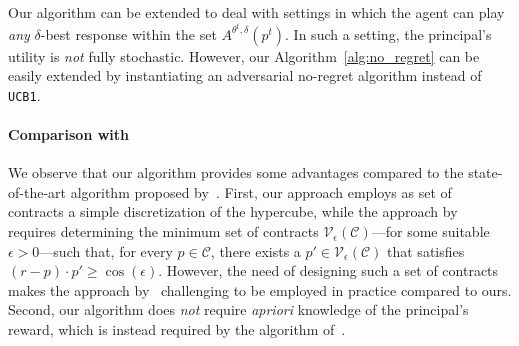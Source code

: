 \begin{remark}
	Our algorithm can be extended to deal with settings in which the agent can play \emph{any} $\delta$-best response within the set $A^{\theta^t,\delta}(p^t)$. In such a setting, the principal's utility is \emph{not} fully stochastic. However, our Algorithm~\ref{alg:no_regret} can be easily extended by instantiating an adversarial no-regret algorithm instead of \texttt{UCB1}.
\end{remark}
%


\paragraph{Comparison with~\citep{Zhu2023Sample}}
%
We observe that our algorithm provides some advantages compared to the state-of-the-art algorithm proposed by~\citet{Zhu2023Sample}.
%
First, our approach employs as set of contracts a simple discretization of the hypercube, while the approach by~\citet{Zhu2023Sample} requires determining the minimum set of contracts $\mathcal{V}_{\epsilon}(\mathcal{C})$---for some suitable $\epsilon>0$---such that, for every $p \in \mathcal{C}$, there exists a $p' \in \mathcal{V}_{\epsilon}(\mathcal{C})$ that satisfies $(r - p) \cdot p' \ge \cos(\epsilon)$.
%
However, the need of designing such a set of contracts makes the approach by~\citet{Zhu2023Sample} challenging to be employed in practice compared to ours.
%
Second, our algorithm does \emph{not} require \emph{apriori} knowledge of the principal's reward, which is instead required by the algorithm of~\citet{Zhu2023Sample}.
%





